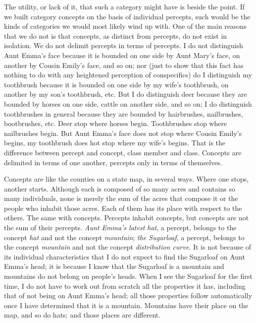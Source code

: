 The utility, or lack of it, that such a category might have is beside the point. If we built category concepts on the basis of individual percepts, such would be the kinds of categories we would most likely wind up with. One of the main reasons that we do not is that concepts, as distinct from percepts, do not exist in isolation. We do not delimit percepts in terms of percepts. I do not distinguish Aunt Emma's face because it is bounded on one side by Aunt Mary's face, on another by Cousin Emily's face, and so on; nor (just to show that this fact has nothing to do with any heightened perception of conspecifics) do I distinguish my toothbrush because it is bounded on one side by my wife's toothbrush, on another by my son's toothbrush, etc. But I do distinguish deer because they are bounded by horses on one side, cattle on another side, and so on; I do distinguish toothbrushes in general because they are bounded by hairbrushes,
nailbrushes, bootbrushes, etc. Deer stop where horses begin. Toothbrushes stop where nailbrushes begin. But Aunt Emma's face does not stop where Cousin Emily's begins, my toothbrush does hot stop where my wife's begins. That is the difference between percept and concept, class member and class. Concepts are delimited in terms of one another, percepts only in terms of themselves.

Concepts are like the counties on a state map, in several ways. Where one stops, another starts. Although each is composed of so many acres and contains so many individuals, none is merely the sum of the acres that compose it or the people who inhabit those acres. Each of them has its place with respect to the others. The same with concepts. Percepts inhabit concepts, but concepts are not the sum of their percepts. \textit{Aunt Emma's latest hat}, a percept, belongs to the concept \textit{hat} and not the concept \textit{mountain}; \textit{the Sugarloaf}, a percept, belongs to the concept \textit{mountain} and not the concept \textit{distribution curve}. It is not because of its individual characteristics that I do not expect to find the Sugarloaf on Aunt Emma's head; it is because I know that the Sugarloaf is a mountain and mountains do not belong on people's heads. When I see the Sugarloaf for the first time, I do not have to work out from scratch all the properties it has, including that of not being on Aunt Emma's head; all those properties follow automatically once I have determined that it is a mountain. Mountains have their place on the map, and so do hats; and those places are different.

